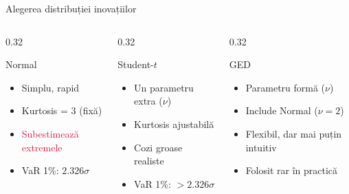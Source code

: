 \documentclass[9pt, aspectratio=169, t]{beamer}
\begin{document}
\begin{frame}{Alegerea distribuției inovațiilor}
    \small
        \begin{columns}[T]
            \begin{column}{0.32\textwidth}
                \begin{block}{\centering Normal}
                    \begin{itemize}
                        \item Simplu, rapid
                        \item Kurtosis = 3 (fixă)
                        \item \textcolor{Crimson}{Subestimează extremele}
                        \item VaR 1\%: $2.326\sigma$
                    \end{itemize}
                \end{block}
            \end{column}
            \begin{column}{0.32\textwidth}
                \begin{block}{\centering Student-$t$}
                    \begin{itemize}
                        \item Un parametru extra ($\nu$)
                        \item Kurtosis ajustabilă
                        \item \textcolor{Forest}{Cozi groase realiste}
                        \item VaR 1\%: $> 2.326\sigma$
                    \end{itemize}
                \end{block}
            \end{column}
            \begin{column}{0.32\textwidth}
                \begin{block}{\centering GED}
                    \begin{itemize}
                        \item Parametru formă ($\nu$)
                        \item Include Normal ($\nu=2$)
                        \item Flexibil, dar mai puțin intuitiv
                        \item Folosit rar în practică
                    \end{itemize}

\end{block}
\end{column}
\end{columns}
\end{frame}
\end{document}
